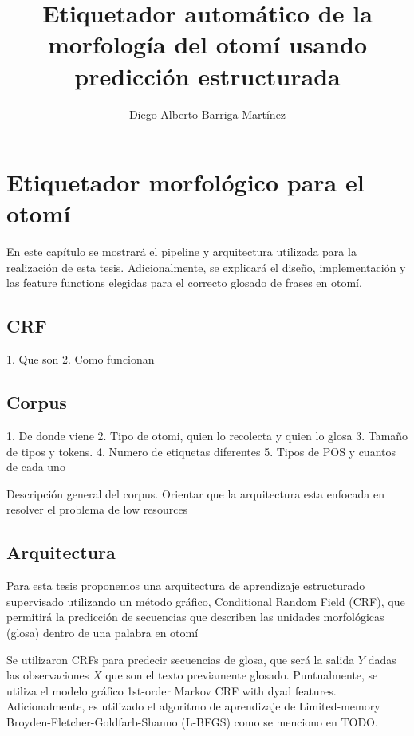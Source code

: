 \documentclass[letterpaper,12pt,oneside]{book}
\begin{document}
\author{Diego Alberto Barriga Martínez}
\title{Etiquetador automático de la morfología del otomí usando predicción estructurada}
\tableofcontents
\maketitle

\chapter{Etiquetador morfológico para el otomí}

En este capítulo se mostrará el pipeline y arquitectura utilizada para la
realización de esta tesis. Adicionalmente, se explicará el diseño,
implementación y las feature functions elegidas para el correcto glosado de
frases en otomí.

\section{CRF}

1. Que son
2. Como funcionan

\section{Corpus}

1. De donde viene
2. Tipo de otomi, quien lo recolecta y quien lo glosa
3. Tamaño de tipos y tokens.
4. Numero de etiquetas diferentes
5. Tipos de POS y cuantos de cada uno

Descripción general del corpus. Orientar que la arquitectura esta enfocada en
resolver el problema de low resources

\section{Arquitectura}

Para esta tesis proponemos una arquitectura de aprendizaje
estructurado  supervisado utilizando un método gráfico, Conditional
Random Field (CRF), que permitirá la predicción de secuencias que describen
las unidades morfológicas (glosa) dentro de una palabra en otomí

Se utilizaron CRFs para predecir secuencias de glosa, que será la salida $Y$
dadas las observaciones $X$ que son el texto previamente glosado. Puntualmente,
se utiliza el modelo gráfico 1st-order Markov CRF with dyad features.
Adicionalmente, es utilizado el algoritmo de aprendizaje de Limited-memory
Broyden-Fletcher-Goldfarb-Shanno (L-BFGS) como se menciono en TODO.
\end{document}
